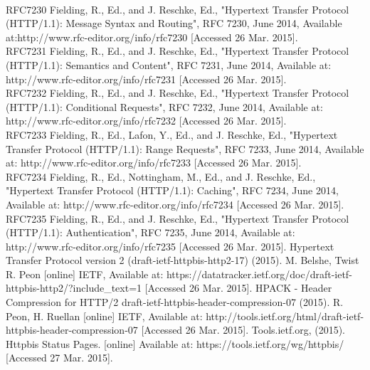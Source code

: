 \documentclass{article}
\begin{document}
\newpage

\newpage










\begin{thebibliography}
\\
RFC7230 Fielding, R., Ed., and J. Reschke, Ed., "Hypertext Transfer Protocol (HTTP/1.1): Message Syntax and Routing", RFC 7230, June 2014, Available at:http://www.rfc-editor.org/info/rfc7230  [Accessed 26 Mar. 2015]. \\
RFC7231 Fielding, R., Ed., and J. Reschke, Ed., "Hypertext Transfer Protocol (HTTP/1.1): Semantics and Content", RFC 7231, June 2014, Available at: http://www.rfc-editor.org/info/rfc7231 [Accessed 26 Mar. 2015]. \\
RFC7232 Fielding, R., Ed., and J. Reschke, Ed., "Hypertext Transfer Protocol (HTTP/1.1): Conditional Requests", RFC 7232, June 2014, Available at: http://www.rfc-editor.org/info/rfc7232 [Accessed 26 Mar. 2015]. \\ 
RFC7233 Fielding, R., Ed., Lafon, Y., Ed., and J. Reschke, Ed., "Hypertext Transfer Protocol (HTTP/1.1): Range Requests", RFC 7233, June 2014, Available at: http://www.rfc-editor.org/info/rfc7233 [Accessed 26 Mar. 2015]. \\
RFC7234 Fielding, R., Ed., Nottingham, M., Ed., and J. Reschke, Ed., "Hypertext Transfer Protocol (HTTP/1.1): Caching", RFC 7234, June 2014, Available at: http://www.rfc-editor.org/info/rfc7234 [Accessed 26 Mar. 2015]. \\
RFC7235 Fielding, R., Ed., and J. Reschke, Ed., "Hypertext Transfer Protocol (HTTP/1.1): Authentication", RFC 7235, June 2014, Available at: http://www.rfc-editor.org/info/rfc7235 [Accessed 26 Mar. 2015].
Hypertext Transfer Protocol version 2 (draft-ietf-httpbis-http2-17) (2015). M. Belshe, Twist R. Peon [online] IETF, Available at:
https://datatracker.ietf.org/doc/draft-ietf-httpbis-http2/?include\_text=1 [Accessed 26 Mar. 2015].
HPACK - Header Compression for HTTP/2 draft-ietf-httpbis-header-compression-07 (2015). R. Peon,  H. Ruellan [online] IETF, Available at: http://tools.ietf.org/html/draft-ietf-httpbis-header-compression-07 [Accessed 26 Mar. 2015].
Tools.ietf.org, (2015). Httpbis Status Pages. [online] Available at: https://tools.ietf.org/wg/httpbis/ [Accessed 27 Mar. 2015].

\end{thebibliography}
\end{document}
